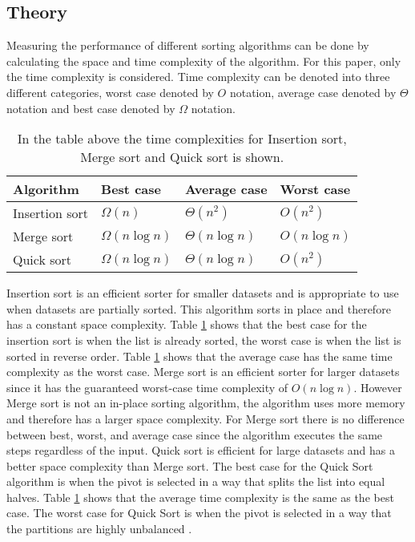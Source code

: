 \documentclass[sigconf, nonacm, natbib, screen, balance=False, 9.5pt]{acmart}
\begin{document}
\subsection{Theory}
Measuring the performance of different sorting algorithms can be done by calculating the space and time complexity of the algorithm. For this paper, only the time complexity is considered. Time complexity can be denoted into three different categories, worst case denoted by $O$ notation, average case denoted by $\Theta$ notation and best case denoted by $\Omega$ notation.
\begin{table}[!h]
  \caption{In the table above the time complexities for Insertion sort, Merge sort and Quick sort is shown\cite{Time_complexity}. }
  \label{tab:comp}
  \begin{tabular}{llll}
    \hline
    Algorithm & Best case  & Average case & Worst case\\
    \hline
    Insertion sort & $\Omega(n)$ & $\Theta(n^2)$ & $O(n^2)$ \\
    Merge sort & $\Omega(n \log n)$ & $\Theta(n \log n)$ & $O(n \log n)$ \\
    Quick sort & $\Omega(n\log n)$&$\Theta(n \log n)$ &$O(n^2
)$\\
    \hline
  \end{tabular}

\end{table}

Insertion sort is an efficient sorter for smaller datasets and is appropriate to use when datasets are partially sorted. This algorithm sorts in place and therefore has a constant space complexity. Table \ref{tab:comp} shows that the best case for the insertion sort is when the list is already sorted, the worst case is when the list is sorted in reverse order. Table \ref{tab:comp} shows that the average case has the same time complexity as the worst case\cite{Insertion_sort}. Merge sort is an efficient sorter for larger datasets since it has the guaranteed worst-case time complexity of $O(n\log n)$. However Merge sort is not an in-place sorting algorithm, the algorithm uses more memory and therefore has a larger space complexity. For Merge sort there is no difference between best, worst, and average case since the algorithm executes the same steps regardless of the input\cite{Merge_sort}. Quick sort is efficient for large datasets and has a better space complexity than Merge sort. The best case for the Quick Sort algorithm is when the pivot is selected in a way that splits the list into equal halves. Table \ref{tab:comp}  shows that the average time complexity is the same as the best case. The worst case for Quick Sort is when the pivot is selected in a way that the partitions are highly unbalanced \cite{Quick_sort}.
\end{document}

